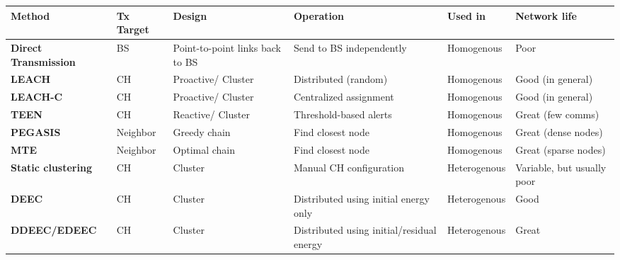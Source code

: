 \begin{longtable}{LLLLLL}
\toprule
\textbf{Method}
&
\textbf{Tx Target}
&
\textbf{Design}
&
\textbf{Operation}
&
\textbf{Used in}
&
\textbf{Network life}
\\ \midrule
\textbf{Direct Transmission}
&
BS
&
Point-to-point links back to BS
&
Send to BS independently
&
Homogenous
&
Poor
\\ \midrule
\textbf{LEACH}
&
CH
&
Proactive/ Cluster
&
Distributed (random)
&
Homogenous
&
Good (in general)
\\ \midrule
\textbf{LEACH-C}
&
CH
&
Proactive/ Cluster
&
Centralized assignment
&
Homogenous
&
Good (in general)
\\ \midrule
\textbf{TEEN}
&
CH
&
Reactive/ Cluster
&
Threshold-based alerts
&
Homogenous
&
Great (few comms)
\\ \midrule
\textbf{PEGASIS}
&
Neighbor
&
Greedy chain
&
Find closest node
&
Homogenous
&
Great (dense nodes)
\\ \midrule
\textbf{MTE}
&
Neighbor
&
Optimal chain
&
Find closest node
&
Homogenous
&
Great (sparse nodes)
\\ \midrule
\textbf{Static clustering}
&
CH
&
Cluster
&
Manual CH configuration
&
Heterogenous
&
Variable, but usually poor
\\ \midrule
\textbf{DEEC}
&
CH
&
Cluster
&
Distributed using initial energy only
&
Heterogenous
&
Good
\\ \midrule
\textbf{DDEEC/EDEEC}
&
CH
&
Cluster
&
Distributed using initial/residual energy
&
Heterogenous
&
Great
\\
\bottomrule
\end{longtable}



